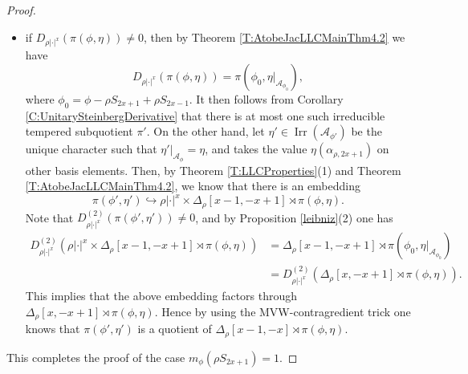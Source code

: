 \documentclass[11pt,letterpaper]{amsart}
\theoremstyle{plain}
\numberwithin{theorem}{section}
\numberwithin{equation}{subsection}
\theoremstyle{remark}
\newcommand{\Irr}{\operatorname{Irr}}
\def\calA{\mathcal{A}}
\begin{document}
\begin{proof}
\begin{itemize}
    \item if $D_{\rho|\cdot|^x}\left(\pi\left(\phi,\eta\right)\right)\neq0$, then by Theorem \ref{T:AtobeJacLLCMainThm4.2} we have
    \[
        D_{\rho|\cdot|^x}\left(\pi\left(\phi,\eta\right)\right) = \pi\left(\phi_0,\eta\big|_{\calA_{\phi_0}}\right),
    \]
    where $\phi_0 = \phi - \rho S_{2x+1} + \rho S_{2x-1}$. It then follows from Corollary \ref{C:UnitarySteinbergDerivative} that there is at most one such irreducible tempered subquotient $\pi'$. On the other hand, let $\eta'\in\Irr\left(\calA_{\phi'}\right)$ be the unique character such that $\eta'\big|_{\calA_\phi} = \eta$, and takes the value $\eta\left(\alpha_{\rho,2x+1}\right)$ on other basis elements. Then, by Theorem \ref{T:LLCProperties}(1) and Theorem \ref{T:AtobeJacLLCMainThm4.2}, we know that there is an embedding
    \[
        \pi\left(\phi',\eta'\right)\hookrightarrow \rho|\cdot|^x \times \Delta_\rho\left[x-1,-x+1\right]\rtimes \pi\left(\phi,\eta\right).
    \]
    Note that $D^{(2)}_{\rho|\cdot|^x}\left(\pi\left(\phi',\eta'\right)\right)\neq 0$, and by Proposition \ref{leibniz}(2) one has
    \begin{align*}
        D^{(2)}_{\rho|\cdot|^x}\left(\rho|\cdot|^x \times \Delta_\rho\left[x-1,-x+1\right]\rtimes \pi\left(\phi,\eta\right)\right) &= \Delta_\rho\left[x-1,-x+1\right]\rtimes\pi\left(\phi_0,\eta\big|_{\calA_{\phi_0}}\right)\\
        & = D^{(2)}_{\rho|\cdot|^x}\left(\Delta_\rho\left[x,-x+1\right]\rtimes \pi\left(\phi,\eta\right)\right).
    \end{align*}
    This implies that the above embedding factors through $\Delta_\rho\left[x,-x+1\right]\rtimes \pi\left(\phi,\eta\right)$. Hence by using the MVW-contragredient trick one knows that $\pi\left(\phi',\eta'\right)$ is a quotient of $\Delta_\rho\left[x-1,-x\right]\rtimes \pi\left(\phi,\eta\right)$.
\end{itemize}
\vskip 5pt
This completes the proof of the case $m_\phi\left(\rho S_{2x+1}\right)=1$.

\vskip 5pt


\end{proof}
\end{document}
